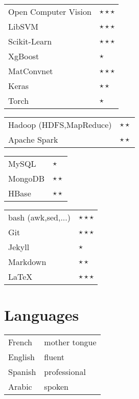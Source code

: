 \documentclass[11pt,a4paper,sans]{moderncv}
\begin{document}
\cvitem{}
{
\hspace{10mm}\begin{tabular}{p{5cm}l}
Open Computer Vision & $\star\star\star$ \\
LibSVM & $\star\star\star$ \\
Scikit-Learn & $\star\star\star$ \\
XgBoost & $\star$ \\
MatConvnet & $\star\star\star$ \\
Keras & $\star\star$ \\
Torch & $\star$ \\
\end{tabular}
\linebreak
}

\cvitem{}
{
\hspace{10mm}\begin{tabular}{p{5cm}l}
Hadoop (HDFS,MapReduce) & $\star\star$ \\
Apache Spark & $\star\star$ \\
\end{tabular}
\linebreak
}
\cvitem{}
{
\hspace{10mm}\begin{tabular}{p{5cm}l}
MySQL & $\star$ \\
MongoDB & $\star\star$ \\
HBase & $\star\star$ \\
\end{tabular}
\linebreak
}

\cvitem{}
{
\hspace{10mm}\begin{tabular}{p{5cm}l}
bash  (awk,sed,...) & $\star\star\star$ \\
Git  & $\star\star\star$ \\
Jekyll  & $\star$ \\
Markdown  & $\star\star$ \\
\LaTeX  & $\star\star\star$ \\
\end{tabular}
\linebreak
}

\section{Languages} 
\cvitem{}
{
\hspace{10mm}\begin{tabular}{p{5cm}l}
French & mother tongue \\
English  & fluent \\
Spanish  & professional \\
Arabic & spoken \\
\end{tabular}
\linebreak
}
\end{document}
